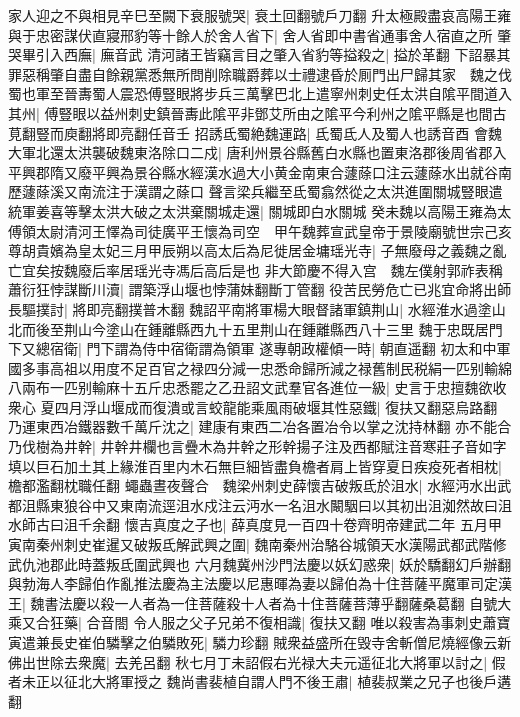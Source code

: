 家人迎之不與相見辛巳至闕下衰服號哭|{
	衰土回翻號戶刀翻}
升太極殿盡哀高陽王雍與于忠密謀伏直寢邢豹等十餘人於舍人省下|{
	舍人省即中書省通事舍人宿直之所}
肇哭畢引入西廡|{
	廡音武}
清河諸王皆竊言目之肇入省豹等搤殺之|{
	搤於革翻}
下詔暴其罪惡稱肇自盡自餘親黨悉無所問削除職爵葬以士禮逮昏於厠門出尸歸其家　魏之伐蜀也軍至晉夀蜀人震恐傅豎眼將步兵三萬擊巴北上遣寧州刺史任太洪自隂平間道入其州|{
	傅豎眼以益州刺史鎮晉夀此隂平非鄧艾所由之隂平今利州之隂平縣是也間古莧翻豎而庾翻將即亮翻任音壬}
招誘氐蜀絶魏運路|{
	氐蜀氐人及蜀人也誘音酉}
會魏大軍北還太洪襲破魏東洛除口二戍|{
	唐利州景谷縣舊白水縣也置東洛郡後周省郡入平興郡隋又廢平興為景谷縣水經漢水過大小黄金南東合蘧蒢口注云蘧蒢水出就谷南歷蘧蒢溪又南流注于漢謂之蒢口}
聲言梁兵繼至氐蜀翕然從之太洪進圍關城豎眼遣統軍姜喜等擊太洪大破之太洪棄關城走還|{
	關城即白水關城}
癸未魏以高陽王雍為太傅領太尉清河王懌為司徒廣平王懷為司空　甲午魏葬宣武皇帝于景陵廟號世宗己亥尊胡貴嬪為皇太妃三月甲辰朔以高太后為尼徙居金墉瑶光寺|{
	子無廢母之義魏之亂亡宜矣按魏廢后率居瑶光寺馮后高后是也}
非大節慶不得入宫　魏左僕射郭祚表稱蕭衍狂悖謀斷川瀆|{
	謂築浮山堰也悖蒲妹翻斷丁管翻}
役苦民勞危亡已兆宜命將出師長驅撲討|{
	將即亮翻撲普木翻}
魏詔平南將軍楊大眼督諸軍鎮荆山|{
	水經淮水過塗山北而後至荆山今塗山在鍾離縣西九十五里荆山在鍾離縣西八十三里}
魏于忠既居門下又總宿衛|{
	門下謂為侍中宿衛謂為領軍}
遂專朝政權傾一時|{
	朝直遥翻}
初太和中軍國多事高祖以用度不足百官之禄四分減一忠悉命歸所減之禄舊制民税絹一匹别輸綿八兩布一匹别輸麻十五斤忠悉罷之乙丑詔文武羣官各進位一級|{
	史言于忠擅魏欲收衆心}
夏四月浮山堰成而復潰或言蛟龍能乘風雨破堰其性惡鐵|{
	復扶又翻惡烏路翻}
乃運東西冶鐵器數千萬斤沈之|{
	建康有東西二冶各置冶令以掌之沈持林翻}
亦不能合乃伐樹為井幹|{
	井幹井欄也言疊木為井幹之形幹揚子注及西都賦注音寒莊子音如字}
填以巨石加土其上緣淮百里内木石無巨細皆盡負檐者肩上皆穿夏日疾疫死者相枕|{
	檐都濫翻枕職任翻}
蠅蟲晝夜聲合　魏梁州刺史薛懷吉破叛氐於沮水|{
	水經沔水出武都沮縣東狼谷中又東南流逕沮水戍注云沔水一名沮水闞駰曰以其初出沮洳然故曰沮水師古曰沮千余翻}
懷吉真度之子也|{
	薛真度見一百四十卷齊明帝建武二年}
五月甲寅南秦州刺史崔暹又破叛氐解武興之圍|{
	魏南秦州治駱谷城領天水漢陽武都武階修武仇池郡此時蓋叛氐圍武興也}
六月魏冀州沙門法慶以妖幻惑衆|{
	妖於驕翻幻戶辦翻}
與勃海人李歸伯作亂推法慶為主法慶以尼惠暉為妻以歸伯為十住菩薩平魔軍司定漢王|{
	魏書法慶以殺一人者為一住菩薩殺十人者為十住菩薩菩薄乎翻薩桑葛翻}
自號大乘又合狂藥|{
	合音閤}
令人服之父子兄弟不復相識|{
	復扶又翻}
唯以殺害為事刺史蕭寶寅遣兼長史崔伯驎擊之伯驎敗死|{
	驎力珍翻}
賊衆益盛所在毁寺舍斬僧尼燒經像云新佛出世除去衆魔|{
	去羌呂翻}
秋七月丁未詔假右光禄大夫元遥征北大將軍以討之|{
	假者未正以征北大將軍授之}
魏尚書裴植自謂人門不後王肅|{
	植裴叔業之兄子也後戶遘翻}
